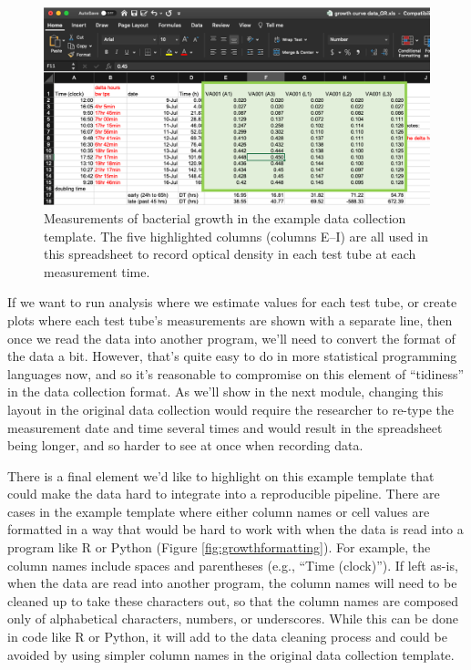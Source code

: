 \documentclass[]{tufte-book}
\begin{document}
\begin{figure}
\includegraphics[width=\textwidth]{figures/growth_curve_growth_measures} \caption[Measurements of bacterial growth in the example data collection template]{Measurements of bacterial growth in the example data collection template. The five highlighted columns (columns E--I) are all used in this spreadsheet to record optical density in each test tube at each measurement time.}\label{fig:growthmeasures}
\end{figure}

If we want to run analysis where we estimate values for each test tube, or
create plots where each test tube's measurements are shown with a separate line,
then once we read the data into another program, we'll need to convert the
format of the data a bit. However, that's quite easy to do in more statistical
programming languages now, and so it's reasonable to compromise on this element
of ``tidiness'' in the data collection format. As we'll show in the next module,
changing this layout in the original data collection would require the
researcher to re-type the measurement date and time several times and would
result in the spreadsheet being longer, and so harder to see at once when
recording data.

There is a final element we'd like to highlight on this example template that
could make the data hard to integrate into a reproducible pipeline. There are
cases in the example template where either column names or cell values are
formatted in a way that would be hard to work with when the data is read into a
program like R or Python (Figure \ref{fig:growthformatting}). For
example, the column names include spaces and parentheses (e.g., ``Time (clock)'').
If left as-is, when the data are read into another program, the column names
will need to be cleaned up to take these characters out, so that the column
names are composed only of alphabetical characters, numbers, or underscores.
While this can be done in code like R or Python, it will add to the data
cleaning process and could be avoided by using simpler column names in the
original data collection template.
\end{document}

